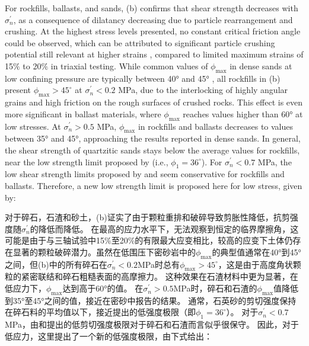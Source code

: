 \begin{ParaColumn}
    For rockfills, ballasts, and sands, (b) confirms that shear strength decreases with $\sigma_n^\prime$, as a consequence of dilatancy decreasing due to particle rearrangement and crushing. At the highest stress levels presented, no constant critical friction angle could be observed, which can be attributed to significant particle crushing potential still relevant at higher strains \citep{Coop2004157}, compared to limited maximum strains of 15$\%$ to 20$\%$ in triaxial testing. While common values of $\phi_{\max}$ in dense sands at low confining pressure are typically between 40° and 45° \citep{Bolton198665,Biarez19941,Schanz1996145}, all rockfills in (b) present $\phi_{\max}>45^\circ$ at $\sigma_n^\prime<0.2$ MPa, due to the interlocking of highly angular grains and high friction on the rough surfaces of crushed rocks. This effect is even more significant in ballast materials, where $\phi_{\max}$ reaches values higher than 60° at low stresses. At $\sigma_n^\prime>0.5$ MPa, $\phi_{\max}$ in rockfills and ballasts decreases to values between 35° and 45°, approaching the results reported in dense sands. In general, the shear strength of quartzitic sands stays below the average values for rockfills, near the low strength limit proposed by \citet{Leps19701159} (i.e., $\phi_1=36^\circ$). For $\sigma_n^\prime<0.7$ MPa, the low shear strength limits proposed by \citet{Leps19701159} and \citet{Indraratna1994539} seem conservative for rockfills and ballasts. Therefore, a new low strength limit is proposed here for low stress, given by:

    \switchcolumn

    对于碎石，石渣和砂土，(b)证实了由于颗粒重排和破碎导致剪胀性降低，抗剪强度随$\sigma_n^\prime$的降低而降低。 在最高的应力水平下，无法观察到恒定的临界摩擦角，这可能是由于与三轴试验中15$\%$至20$\%$的有限最大应变相比，较高的应变下土体仍存在显著的颗粒破碎潜力\citep{Coop2004157}。虽然在低围压下密砂岩中的$\phi_{\max}$的典型值通常在40°到45°之间\citep{Bolton198665,Biarez19941,Schanz1996145}，但(b)中的所有碎石在$\sigma_n^\prime<0.2$MPa时总有$\phi_{\max}>45^\circ$，这是由于高度角状颗粒的紧密联结和碎石粗糙表面的高摩擦力。 这种效果在石渣材料中更为显著，在低应力下，$\phi_{\max}$达到高于60°的值。 在$\sigma_n^\prime>0.5$MPa时，碎石和石渣的$\phi_{\max}$值降低到35°至45°之间的值，接近在密砂中报告的结果。 通常，石英砂的剪切强度保持在碎石料的平均值以下，接近\citet{Leps19701159}提出的低强度极限（即$\phi_1=36^\circ$）。 对于$\sigma_n^\prime<0.7$MPa，由\citet{Leps19701159}和\citet{Indraratna1994539}提出的低剪切强度极限对于碎石和石渣而言似乎很保守。 因此，对于低应力，这里提出了一个新的低强度极限，由下式给出：


\end{ParaColumn}
